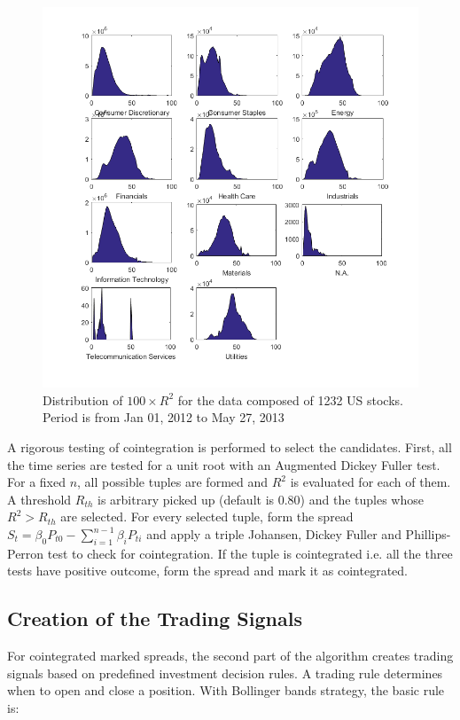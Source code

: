 \documentclass[11pt,a4,twosided,singlespacing,titlepagenumber=on]{scrreprt}
\numberwithin{equation}{chapter} %
\theoremstyle{remark}
\begin{document}
\begin{figure}[htb]
\centering
\includegraphics[width = 1\textwidth]{R2_ret_Quads_Jan_1_2012_Mar_27_2013}
\caption{Distribution of $100 \times R^2$ for the data composed of 1232 US stocks. Period is from Jan 01, 2012 to May 27, 2013}
\label{apple_2003_2006}
\end{figure}


\noindent
A rigorous testing of cointegration is performed to select the candidates. First, all the time series are tested for a unit root with an Augmented Dickey Fuller test. For a fixed $n$, all possible tuples are formed and $R^2$ is evaluated for each of them. A threshold $R_{th}$ is arbitrary picked up (default is 0.80) and the tuples whose $R^2> R_{th}$ are selected. For every selected tuple, form the spread $S_t = \beta_0 P_{t0} - \sum_{i=1}^{n-1} \beta_i P_{ti}$ and apply a triple Johansen, Dickey Fuller and Phillips-Perron test to check for cointegration. If the tuple is cointegrated i.e. all the three tests have positive outcome, form the spread and mark it as cointegrated.

\subsection{Creation of the Trading Signals}
For cointegrated marked spreads, the second part of the algorithm creates trading signals based on predefined investment decision rules. A trading rule determines when to open and close a position. With Bollinger bands strategy, the basic rule is:
\end{document}
